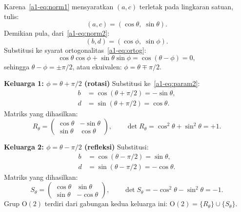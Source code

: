 \vspace{0.5em}
Karena~\eqref{a1-eq:norm1} mensyaratkan $(a,c)$ terletak pada lingkaran satuan, tulis:
\begin{equation}\label{a1-eq:param1}
    (a,c) = (\cos\theta,\;\sin\theta).
\end{equation}
Demikian pula, dari~\eqref{a1-eq:norm2}:
\begin{equation}\label{a1-eq:param2}
    (b,d) = (\cos\phi,\;\sin\phi).
\end{equation}
Substitusi ke syarat ortogonalitas~\eqref{a1-eq:ortog}:
\begin{equation}
    \cos\theta\cos\phi + \sin\theta\sin\phi = \cos(\theta - \phi) = 0,
\end{equation}
sehingga $\theta - \phi = \pm\pi/2$, atau ekuivalen: $\phi = \theta \mp \pi/2$.

\vspace{0.5em}
\noindent \textbf{Keluarga 1: $\phi = \theta + \pi/2$ (rotasi)}
Substitusi ke~\eqref{a1-eq:param2}:
\begin{align}
    b &= \cos(\theta + \pi/2) = -\sin\theta, \nonumber\\
    d &= \sin(\theta + \pi/2) = \cos\theta.
\end{align}
Matriks yang dihasilkan:
\begin{equation}\label{a1-eq:rotation}
    R_\theta = \begin{pmatrix}\cos\theta & -\sin\theta \\ \sin\theta & \cos\theta\end{pmatrix},
    \qquad \det R_\theta = \cos^2\theta + \sin^2\theta = +1.
\end{equation}

\vspace{0.5em}
\noindent \textbf{Keluarga 2: $\phi = \theta - \pi/2$ (refleksi)}
Substitusi:
\begin{align}
    b &= \cos(\theta - \pi/2) = \sin\theta, \nonumber\\
    d &= \sin(\theta - \pi/2) = -\cos\theta.
\end{align}
Matriks yang dihasilkan:
\begin{equation}\label{a1-eq:reflection}
    S_\theta = \begin{pmatrix}\cos\theta & \sin\theta \\ \sin\theta & -\cos\theta\end{pmatrix},
    \qquad \det S_\theta = -\cos^2\theta - \sin^2\theta = -1.
\end{equation}
Grup $\mathrm{O}(2)$ terdiri dari gabungan kedua keluarga ini: $\mathrm{O}(2) = \{R_\theta\} \cup \{S_\theta\}$.

